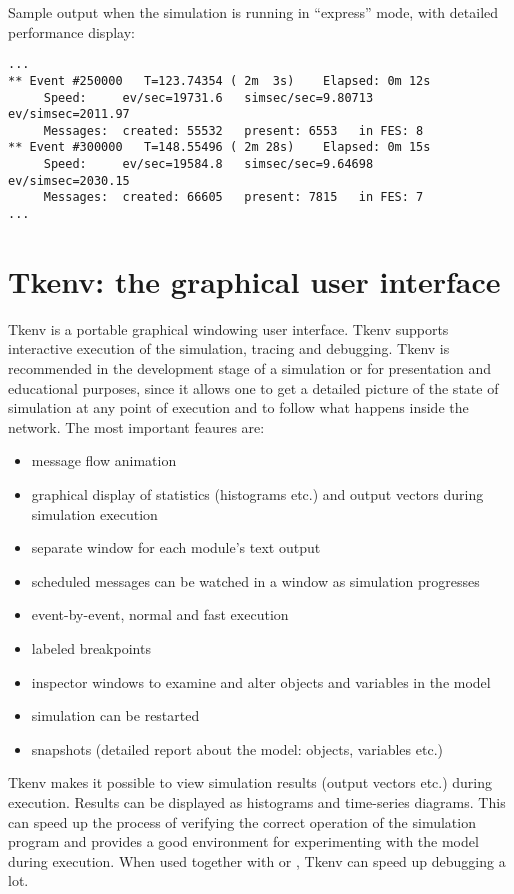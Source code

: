Sample output when the simulation is running in ``express'' mode,
with detailed performance display:

\begin{verbatim}
...
** Event #250000   T=123.74354 ( 2m  3s)    Elapsed: 0m 12s
     Speed:     ev/sec=19731.6   simsec/sec=9.80713   ev/simsec=2011.97
     Messages:  created: 55532   present: 6553   in FES: 8
** Event #300000   T=148.55496 ( 2m 28s)    Elapsed: 0m 15s
     Speed:     ev/sec=19584.8   simsec/sec=9.64698   ev/simsec=2030.15
     Messages:  created: 66605   present: 7815   in FES: 7
...
\end{verbatim}

\section{Tkenv: the graphical user interface}


Tkenv is a portable graphical windowing user interface.
Tkenv supports interactive execution of the simulation, tracing and
debugging. Tkenv is recommended in the
development stage of a simulation or for presentation and educational
purposes, since it allows one to get a detailed picture of the state
of simulation at any point of execution and to follow what happens
inside the network. The most important feaures are:
\begin{itemize}
  \item{message flow animation}
  \item{graphical display of statistics (histograms etc.) and output
    vectors during simulation execution}
  \item{separate window for each module's text output}
  \item{scheduled messages can be watched in a window as simulation
    progresses}
  \item{event-by-event, normal and fast execution}
  \item{labeled breakpoints}
  \item{inspector windows to examine and alter objects and variables
    in the model}
  \item{simulation can be restarted}
  \item{snapshots (detailed report about the model: objects, variables
    etc.)}
\end{itemize}


Tkenv makes it possible to view simulation results (output vectors
etc.) during execution. Results can be displayed as histograms and
time-series diagrams. This can speed up the process of verifying the
correct operation of the simulation program and provides a good
environment for experimenting with the model during execution.  When
used together with  or , Tkenv can speed up
debugging a lot.

